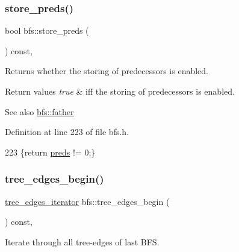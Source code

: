\subsubsection{\texorpdfstring{store\+\_\+preds()}{store\_preds()}\hspace{0.1cm}{\footnotesize\ttfamily [2/2]}}
{\footnotesize\ttfamily bool bfs\+::store\+\_\+preds (\begin{DoxyParamCaption}{ }\end{DoxyParamCaption}) const\hspace{0.3cm}{\ttfamily [inline]}, {\ttfamily [inherited]}}



Returns whether the storing of predecessors is enabled. 


\begin{DoxyRetVals}{Return values}
{\em true} & iff the storing of predecessors is enabled. \\
\hline
\end{DoxyRetVals}
\begin{DoxySeeAlso}{See also}
\mbox{\hyperlink{classbfs_a3e1a7b0e4bde586d0be44616e533c59c}{bfs\+::father}} 
\end{DoxySeeAlso}


Definition at line 223 of file bfs.\+h.


\begin{DoxyCode}
223 \{\textcolor{keywordflow}{return} \mbox{\hyperlink{classbfs_a3bac5ed333bb78a30a67099c3b94aa0c}{preds}} != 0;\}
\end{DoxyCode}
\mbox{\label{classbfs_a56959215efdfee1a37826ad315ac13e7}} 
\subsubsection{\texorpdfstring{tree\+\_\+edges\+\_\+begin()}{tree\_edges\_begin()}}
{\footnotesize\ttfamily \mbox{\hyperlink{classbfs_a04e608fe18089e5495cadb995aa75261}{tree\+\_\+edges\+\_\+iterator}} bfs\+::tree\+\_\+edges\+\_\+begin (\begin{DoxyParamCaption}{ }\end{DoxyParamCaption}) const\hspace{0.3cm}{\ttfamily [inline]}, {\ttfamily [inherited]}}



Iterate through all tree-\/edges of last B\+FS. 

